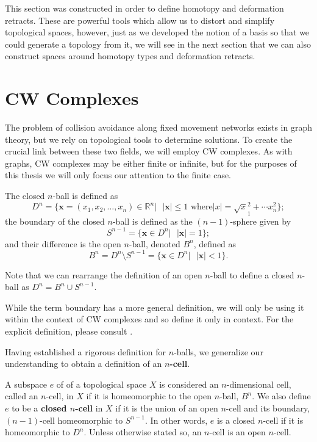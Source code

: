 \documentclass[12pt,oneside]{amsbook}
\newenvironment{defn}[1][Definition.]{\begin{trivlist}
\item[\hskip \labelsep {\bfseries #1}]}{\end{trivlist}}
\newcommand{\R}{\mathbb{R}}
\newcommand{\n}{$n$}
\begin{document}
This section was constructed in order to define homotopy and deformation retracts. These are powerful tools which allow us to distort and simplify topological spaces, however, just as we developed the notion of a basis so that we could generate a topology from it, we will see in the next section that we can also construct spaces around homotopy types and deformation retracts.



\section{CW Complexes}
The problem of collision avoidance along fixed movement networks exists in graph theory, but we rely on topological tools to determine solutions. To create the crucial link between these two fields, we will employ CW complexes. As with graphs, CW complexes may be either finite or infinite, but for the purposes of this thesis we will only focus our attention to the finite case.

\begin{defn}
The closed $n$-ball is defined as $$D^n=\{\textbf{x}=(x_1,x_2,\dots, x_n)\in \R^n |\text{  } |\textbf{x}| \leq 1 \text{ where} |x|=\sqrt x_1^2+\cdots x_n^2
 \};$$ the boundary of the closed \n-ball is defined as the $(n-1)$-sphere given by $$ S^{n-1} = \{\textbf{x}\in D^n | \text{  } |\textbf{x}|=1\};$$ and their difference is the open \n-ball, denoted $B^n$, defined as $$B^n = D^n \setminus S^{n-1} = \{\textbf{x}\in D^n | \text{  } |\textbf{x}|< 1\}.$$ 
\end{defn}
Note that we can rearrange the definition of an open \n-ball to define a closed \n-ball as $D^n= B^n \cup S^{n-1}$. 

While the term boundary has a more general definition, we will only be using it within the context of CW complexes and so define it only in context. For the explicit definition, please consult \cite{factory}.


Having established a rigorous definition for \n-balls, we generalize our understanding to obtain a definition of an \textbf{ \n-cell}.

\begin{defn}
A subspace $e$ of of a topological space $X$ is considered an $n$-dimensional cell, called an \n-cell, in $X$ if it is homeomorphic to the open $n$-ball, $B^n$. We also define $e$ to be a \textbf{closed \n-cell} in $X$ if it is the union of an open \n-cell and its boundary, $(n-1)$-cell homeomorphic to $S^{n-1}$. In other words, $e$ is a closed $n$-cell if it is homeomorphic to $D^n$. Unless otherwise stated so, an $n$-cell is an open $n$-cell. 
\end{defn}
\end{document}
